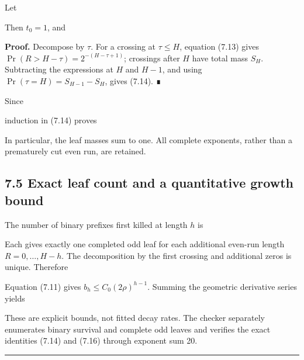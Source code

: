 Let


Then \(t_0=1\), and


\textbf{Proof.} Decompose by \(\tau\). For a crossing at \(\tau\le H\),
equation (7.13) gives \(\Pr(R>H-\tau)=2^{-(H-\tau+1)}\); crossings after
\(H\) have total mass \(S_H\). Subtracting the expressions at \(H\) and
\(H-1\), and using \(\Pr(\tau=H)=S_{H-1}-S_H\), gives (7.14). ∎

Since


induction in (7.14) proves


In particular, the leaf masses sum to one. All complete exponents,
rather than a prematurely cut even run, are retained.

\subsection{7.5 Exact leaf count and a quantitative growth bound}

The number of binary prefixes first killed at length \(h\) is


Each gives exactly one completed odd leaf for each additional even-run
length \(R=0,\ldots,H-h\). The decomposition by the first crossing and
additional zeros is unique. Therefore


Equation (7.11) gives \(b_h\le C_0(2\rho)^{h-1}\). Summing the geometric
derivative series yields


These are explicit bounds, not fitted decay rates. The checker
separately enumerates binary survival and complete odd leaves and
verifies the exact identities (7.14) and (7.16) through exponent sum 20.

\begin{center}\rule{0.5\linewidth}{0.5pt}\end{center}

